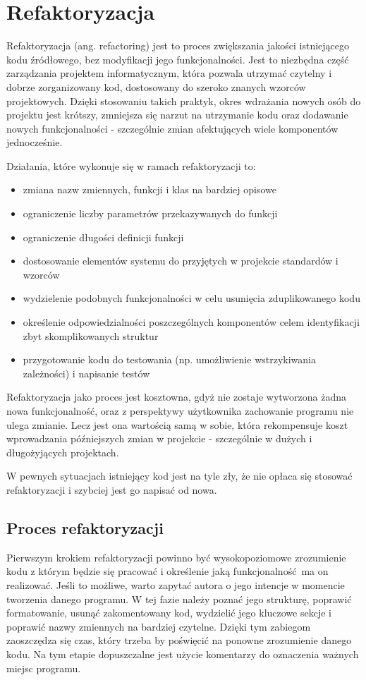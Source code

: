 \section{Refaktoryzacja}
Refaktoryzacja (ang. refactoring) jest to proces zwiększania jakości istniejącego kodu źródłowego, bez modyfikacji jego funkcjonalności. 
Jest to niezbędna część zarządzania projektem informatycznym, która pozwala utrzymać czytelny i dobrze zorganizowany kod, dostosowany do szeroko znanych wzorców projektowych.
Dzięki stosowaniu takich praktyk, okres wdrażania nowych osób do projektu jest krótszy, zmniejsza się narzut na utrzymanie kodu oraz dodawanie nowych funkcjonalności - szczególnie zmian afektujących wiele komponentów jednocześnie. 

Działania, które wykonuje się w ramach refaktoryzacji to:
\begin{itemize}
\item zmiana nazw zmiennych, funkcji i klas na bardziej opisowe
\item ograniczenie liczby parametrów przekazywanych do funkcji
\item ograniczenie długości definicji funkcji
\item dostosowanie elementów systemu do przyjętych w projekcie standardów i wzorców
\item wydzielenie podobnych funkcjonalności w celu usunięcia zduplikowanego kodu
\item określenie odpowiedzialności poszczególnych komponentów celem identyfikacji zbyt skomplikowanych struktur
\item przygotowanie kodu do testowania (np. umożliwienie wstrzykiwania zależności) i napisanie testów
\end{itemize}

Refaktoryzacja jako proces jest kosztowna, gdyż nie zostaje wytworzona żadna nowa funkcjonalność, oraz z perspektywy użytkownika zachowanie programu nie ulega zmianie.
Lecz jest ona wartością samą w sobie, która rekompensuje koszt wprowadzania późniejszych zmian w projekcie - szczególnie w dużych i długożyjących projektach.

W pewnych sytuacjach istniejący kod jest na tyle zły, że nie opłaca się stosować refaktoryzacji i szybciej jest go napisać od nowa. 

\subsection{Proces refaktoryzacji}
Pierwszym krokiem refaktoryzacji powinno być wysokopoziomowe zrozumienie kodu z którym będzie się pracować i określenie jaką funkcjonalność ma on realizować.
Jeśli to możliwe, warto zapytać autora o jego intencje w momencie tworzenia danego programu. 
W tej fazie należy poznać jego strukturę, poprawić formatowanie, usunąć zakomentowany kod, wydzielić jego kluczowe sekcje i poprawić nazwy zmiennych na bardziej czytelne.
Dzięki tym zabiegom zaoszczędza się czas, który trzeba by poświęcić na ponowne zrozumienie danego kodu.
Na tym etapie dopuszczalne jest użycie komentarzy do oznaczenia ważnych miejsc programu. 

